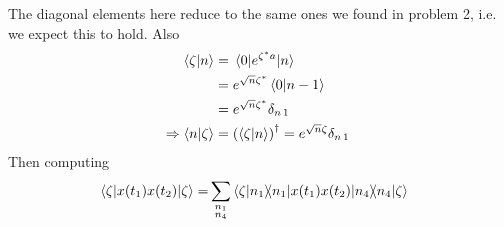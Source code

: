 \documentclass[a4paper,11pt]{article}
\begin{document}
The diagonal elements here reduce to the same ones we found in problem 2, i.e. we expect this to hold.
Also
\begin{equation}
\begin{aligned}
\braket{\zeta}{n}&=\mel{0}{e^{\zeta^* a}}{n}\\
&=e^{\sqrt{n}\zeta^*}\braket{0}{n-1}\\
&=e^{\sqrt{n}\zeta^*}\delta_{n\,1}\\
\Rightarrow\braket{n}{\zeta}&=\left(\braket{\zeta}{n}\right)^{\dagger}=e^{\sqrt{n}\zeta}\delta_{n\,1}\
\end{aligned}
\end{equation}
Then computing
\begin{equation}
	\begin{aligned}
		\mel{\zeta}{x(t_1)x(t_2)}{\zeta}=&\sum_{\substack{n_1\\n_4}}\braket{\zeta}{n_1}\hspace*{-0.2cm}\mel{n_1}{x(t_1)x(t_2)}{n_4}\hspace*{-0.15cm}\braket{n_4}{\zeta}
	\end{aligned}
\end{equation}
\end{document}
